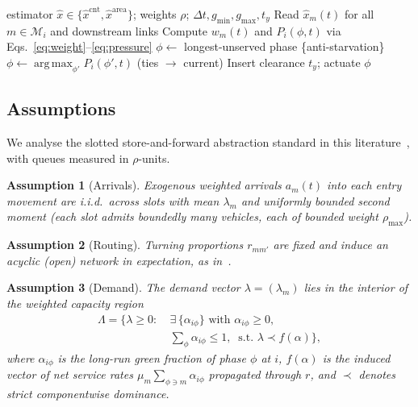 \documentclass[journal]{IEEEtran}
\newtheorem{assumption}{Assumption}
\newcommand{\Mset}{\mathcal{M}}
\DeclareMathOperator*{\argmax}{arg\,max}
\begin{document}
\begin{algorithm}[htbp]
\caption{Greedy HAP control at intersection $i$}
\label{alg:greedy}
\begin{algorithmic}[1]
\REQUIRE estimator $\hat{x} \in \{\hat{x}^{\mathrm{cnt}},
         \hat{x}^{\mathrm{area}}\}$; weights $\rho$;
         $\Delta t, g_{\min}, g_{\max}, t_y$
  \STATE Read $\hat{x}_m(t)$ for all $m \in \Mset_i$ and downstream links
  \STATE Compute $w_m(t)$ and $P_i(\phi,t)$ via
         Eqs.~\eqref{eq:weight}--\eqref{eq:pressure}
    \STATE $\phi \leftarrow$ longest-unserved phase \quad
           \{anti-starvation\}
  \ELSE
    \STATE $\phi \leftarrow \argmax_{\phi'} P_i(\phi',t)$ \quad
           (ties $\rightarrow$ current)
  \ENDIF
    \STATE Insert clearance $t_y$; actuate $\phi$
  \ENDIF
\ENDFOR
\end{algorithmic}
\end{algorithm}

\subsection{Assumptions}
\label{subsec:assumptions}
We analyse the slotted store-and-forward abstraction standard in this
literature~\cite{b_varaiya,b_tassiulas}, with queues measured in
$\rho$-units.

\begin{assumption}[Arrivals]\label{as:a1}
Exogenous weighted arrivals $a_m(t)$ into each entry movement are i.i.d.\
across slots with mean $\lambda_m$ and uniformly bounded second moment
(each slot admits boundedly many vehicles, each of bounded weight
$\rho_{\max}$).
\end{assumption}

\begin{assumption}[Routing]\label{as:a2}
Turning proportions $r_{mm'}$ are fixed and induce an acyclic (open)
network in expectation, as in~\cite{b_varaiya}.
\end{assumption}

\begin{assumption}[Demand]\label{as:a3}
The demand vector $\lambda=(\lambda_m)$ lies in the interior of the
weighted capacity region
\begin{equation}
\begin{aligned}
\Lambda = \big\{\lambda \ge 0 :\ &\exists\, \{\alpha_{i\phi}\}
  \text{ with } \alpha_{i\phi}\ge 0,\\[-2pt]
 &\textstyle\sum_{\phi}\alpha_{i\phi}\le 1,\
  \text{ s.t. } \lambda \prec f(\alpha)\big\},
\end{aligned}
\label{eq:capregion}
\end{equation}
where $\alpha_{i\phi}$ is the long-run green fraction of phase $\phi$ at
$i$, $f(\alpha)$ is the induced vector of net service rates
$\mu_m \sum_{\phi \ni m}\alpha_{i\phi}$ propagated through $r$, and
$\prec$ denotes strict componentwise dominance.
\end{assumption}
\end{document}
